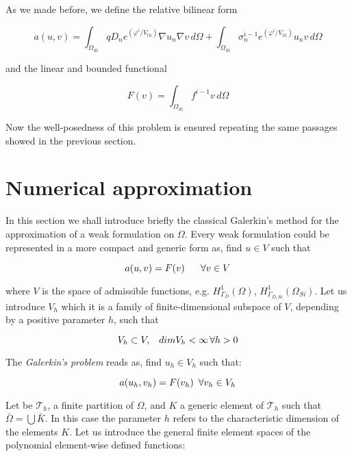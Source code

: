 As we made before, we define the relative bilinear form

\begin{equation}
\label{eq: bilinear form LEC}
a(u,v) =  \int_{\Omega_{Si}}  q D_n e^{(\varphi^{i}/V_{th})} \nabla u_n \nabla v \, d\Omega + \int_{\Omega_{Si}} \sigma_n^{i-1} e^{(\varphi^{i}/V_{th})} u_n v \, d\Omega
\end{equation}

and the linear and bounded functional

\begin{equation}
\label{eq: functional LEC}
F(v) = \int_{\Omega_{Si}} f^{i-1}v \, d\Omega
\end{equation}

Now the well-posedness of this problem is ensured repeating the same passages showed in the previous section.



\section{Numerical approximation}



In this section we shall introduce briefly the classical Galerkin's method for the approximation of a weak formulation on $\Omega$. Every weak formulation could be represented in a more compact and generic form as, find $u \in V$ such that

\begin{equation}
a(u,v) = F(v) \psp{10} \forall v \in V
\end{equation}

where $V$ is the space of admissible functions, e.g. $H^1_{\Gamma_D}(\Omega)$, $H^1_{\Gamma_{D,Si}}(\Omega_{Si})$.
 Let us introduce $V_h$ which it is a family of finite-dimensional subspace of $V$, depending by a positive parameter $h$, such that

\begin{equation}
V_h \subset V, \psp{5} dim V_h < \infty \, \forall h>0
\end{equation}

The \textit{Galerkin's problem} reads as, find $u_h\in V_h$ such that:

\begin{equation}
\label{eq: general galerkin problem}
 a(u_h,v_h) = F(v_h) \psp{3} \forall v_h \in V_h
\end{equation}

Let be $\mathcal{T}_h$, a finite partition of $\Omega$, and $K$ a generic element of $\mathcal{T}_h$ such that  $\bar{\Omega} =  \bigcup \bar{K}$. In this case the parameter $h$ refers to the characteristic dimension of the elements $K$.
Let us introduce the general finite element spaces of the polynomial element-wise defined functions:

